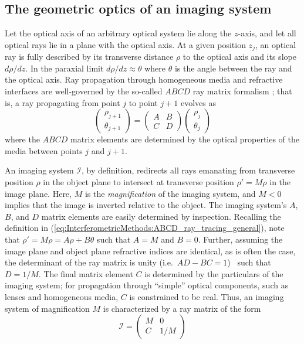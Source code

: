 \subsection{The geometric optics of an imaging system}
Let the optical axis of an arbitrary optical system lie along the $z$-axis,
and let all optical rays lie in a plane with the optical axis.
At a given position $z_j$, an optical ray is fully described by
its transverse distance $\rho$ to the optical axis and
its slope $d\rho / dz$.
In the paraxial limit $d\rho / dz \approx \theta$
where $\theta$ is the angle between the ray and the optical axis.
Ray propagation through homogeneous media and refractive interfaces
are well-governed by the so-called $ABCD$ ray matrix formalism
\cite[Ch.~15]{siegman_lasers};
that is, a ray propagating from point $j$ to point $j + 1$ evolves as
\begin{equation}
  \begin{pmatrix}
    \rho_{j + 1}
    \\
    \theta_{j + 1}
  \end{pmatrix}
  =
  \begin{pmatrix}
    A & B
    \\
    C & D
  \end{pmatrix}
  \begin{pmatrix}
    \rho_j
    \\
    \theta_j
  \end{pmatrix}
  \label{eq:InterferometricMethods:ABCD_ray_tracing_general}
\end{equation}
where the $ABCD$ matrix elements are determined
by the optical properties of the media between points $j$ and $j + 1$.

An imaging system $\mathcal{I}$, by definition,
redirects all rays emanating from transverse position $\rho$
in the object plane
to intersect at transverse position $\rho' = M \rho$
in the image plane.
Here, $M$ is the \emph{magnification} of the imaging system, and
$M < 0$ implies that the image is inverted relative to the object.
The imaging system's $A$, $B$, and $D$ matrix elements
are easily determined by inspection.
Recalling the definition in
(\ref{eq:InterferometricMethods:ABCD_ray_tracing_general}),
note that $\rho' = M \rho = A \rho + B \theta$
such that $A = M$ and $B = 0$.
Further, assuming the image plane and object plane refractive indices
are identical, as is often the case,
the determinant of the ray matrix is unity
(i.e.\ $AD - BC = 1$)~\cite{halbach_63}
such that $D = 1 / M$.
The final matrix element $C$ is determined by the particulars
of the imaging system;
for propagation through ``simple'' optical components,
such as lenses and homogeneous media, $C$ is constrained to be real.
Thus, an imaging system of magnification $M$ is characterized
by a ray matrix of the form
\begin{equation}
  \mathcal{I}
  =
  \begin{pmatrix}
    M & 0
    \\
    C & 1 / M
  \end{pmatrix}
  \label{eq:InterferometricMethods:ABCD_imaging}
\end{equation}

